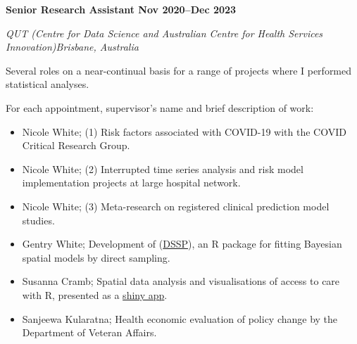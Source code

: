 
\textbf{Senior Research Assistant \hfill Nov 2020--Dec 2023}\par
\textit{QUT (Centre for Data Science and Australian Centre for Health Services Innovation)\hfill Brisbane, Australia}\par
Several roles on a near-continual basis for a range of projects where I performed statistical analyses.\par
For each appointment, supervisor's name and brief description of work:\par
\begin{itemize}
	\item Nicole White; (1) Risk factors associated with COVID-19 with the COVID Critical Research Group.
	\item Nicole White; (2) Interrupted time series analysis and risk model implementation projects at large hospital network.
	\item Nicole White; (3) Meta-research on registered clinical prediction model studies.
    \item Gentry White; Development of (\href{https://cran.r-project.org/web/packages/DSSP/index.html}{DSSP}), an R package for fitting Bayesian spatial models by direct sampling.
	\item Susanna Cramb; Spatial data analysis and visualisations of access to care with R, presented as a \href{https://github.com/RWParsons/iTRAQI_app/}{shiny app}.
	\item Sanjeewa Kularatna; Health economic evaluation of policy change by the Department of Veteran Affairs.
\end{itemize}\par
